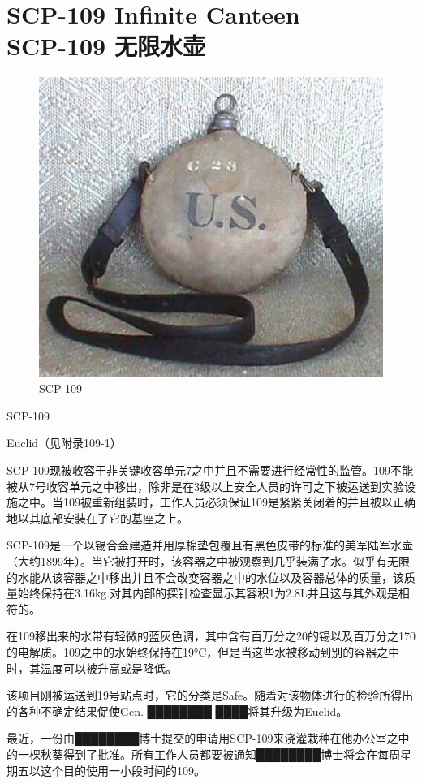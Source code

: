 \chapter[SCP-109 无限水壶]{
    SCP-109 Infinite Canteen\\
    SCP-109 无限水壶
}

\label{chap:SCP-109}

\begin{figure}[H]
    \centering
    \includegraphics[width=0.5\linewidth]{images/SCP.109.jpg}
    \caption*{SCP-109}
\end{figure}

SCP-109

Euclid（见附录109-1）

SCP-109现被收容于非关键收容单元7之中并且不需要进行经常性的监管。109不能被从7号收容单元之中移出，除非是在3级以上安全人员的许可之下被运送到实验设施之中。当109被重新组装时，工作人员必须保证109是紧紧关闭着的并且被以正确地以其底部安装在了它的基座之上。

SCP-109是一个以锡合金建造并用厚棉垫包覆且有黑色皮带的标准的美军陆军水壶（大约1899年）。当它被打开时，该容器之中被观察到几乎装满了水。似乎有无限的水能从该容器之中移出并且不会改变容器之中的水位以及容器总体的质量，该质量始终保持在3.16kg.对其内部的探针检查显示其容积1为2.8L并且这与其外观是相符的。

在109移出来的水带有轻微的蓝灰色调，其中含有百万分之20的锡以及百万分之170的电解质。109之中的水始终保持在19°C，但是当这些水被移动到别的容器之中时，其温度可以被升高或是降低。

该项目刚被运送到19号站点时，它的分类是Safe。随着对该物体进行的检验所得出的各种不确定结果促使Gen. ████████ ████将其升级为Euclid。

最近，一份由████████博士提交的申请用SCP-109来浇灌栽种在他办公室之中的一棵秋葵得到了批准。所有工作人员都要被通知████████博士将会在每周星期五以这个目的使用一小段时间的109。

